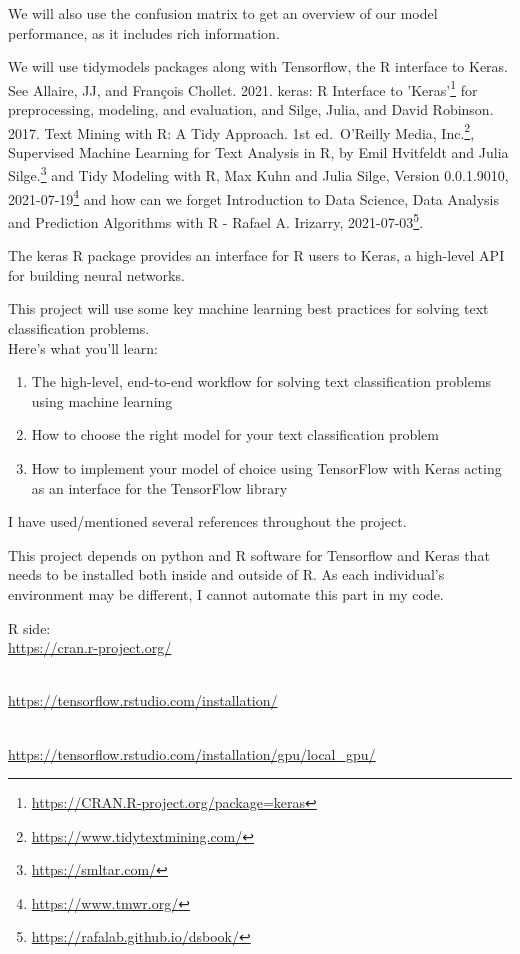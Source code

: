\documentclass[
]{article}
\DeclareRobustCommand{\href}[2]{#2\footnote{\url{#1}}}
\providecommand{\tightlist}{%
  \setlength{\itemsep}{0pt}\setlength{\parskip}{0pt}}
\begin{document}
We will also use the confusion matrix to get an overview of our model
performance, as it includes rich information.

We will use tidymodels packages along with Tensorflow, the R interface
to Keras. See \href{https://CRAN.R-project.org/package=keras}{Allaire,
JJ, and François Chollet. 2021. keras: R Interface to 'Keras'} for
preprocessing, modeling, and evaluation, and
\href{https://www.tidytextmining.com/}{Silge, Julia, and David Robinson.
2017. Text Mining with R: A Tidy Approach. 1st ed.~O'Reilly Media,
Inc.}, \href{https://smltar.com/}{Supervised Machine Learning for Text
Analysis in R, by Emil Hvitfeldt and Julia Silge.} and
\href{https://www.tmwr.org/}{Tidy Modeling with R, Max Kuhn and Julia
Silge, Version 0.0.1.9010, 2021-07-19} and how can we forget
\href{https://rafalab.github.io/dsbook/}{Introduction to Data Science,
Data Analysis and Prediction Algorithms with R - Rafael A. Irizarry,
2021-07-03}.

The keras R package provides an interface for R users to Keras, a
high-level API for building neural networks.

This project will use some key machine learning best practices for
solving text classification problems.\\
Here's what you'll learn:

\begin{enumerate}
\def\labelenumi{\arabic{enumi}.}
\tightlist
\item
  The high-level, end-to-end workflow for solving text classification
  problems using machine learning
\item
  How to choose the right model for your text classification problem
\item
  How to implement your model of choice using TensorFlow with Keras
  acting as an interface for the TensorFlow library
\end{enumerate}

I have used/mentioned several references throughout the project.

This project depends on python and R software for Tensorflow and Keras
that needs to be installed both inside and outside of R. As each
individual's environment may be different, I cannot automate this part
in my code.

R side:\\
\url{https://cran.r-project.org/}\strut \\
\url{https://tensorflow.rstudio.com/installation/}\strut \\
\url{https://tensorflow.rstudio.com/installation/gpu/local_gpu/}
\end{document}
